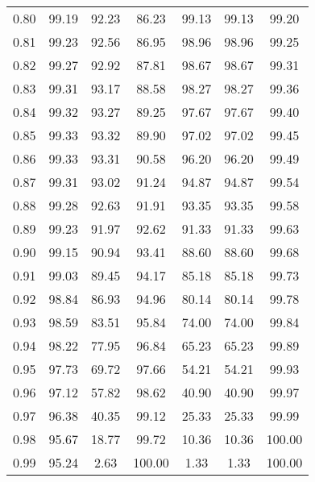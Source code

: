 \begin{tabular}{|c|c|c|c|c|c|c|}
      0.80 &     99.19 &     92.23 &      86.23 &   99.13 &      99.13 &         99.20 \\
      0.81 &     99.23 &     92.56 &      86.95 &   98.96 &      98.96 &         99.25 \\
      0.82 &     99.27 &     92.92 &      87.81 &   98.67 &      98.67 &         99.31 \\
      0.83 &     99.31 &     93.17 &      88.58 &   98.27 &      98.27 &         99.36 \\
      0.84 &     99.32 &     93.27 &      89.25 &   97.67 &      97.67 &         99.40 \\
      0.85 &     99.33 &     93.32 &      89.90 &   97.02 &      97.02 &         99.45 \\
      0.86 &     99.33 &     93.31 &      90.58 &   96.20 &      96.20 &         99.49 \\
      0.87 &     99.31 &     93.02 &      91.24 &   94.87 &      94.87 &         99.54 \\
      0.88 &     99.28 &     92.63 &      91.91 &   93.35 &      93.35 &         99.58 \\
      0.89 &     99.23 &     91.97 &      92.62 &   91.33 &      91.33 &         99.63 \\
      0.90 &     99.15 &     90.94 &      93.41 &   88.60 &      88.60 &         99.68 \\
      0.91 &     99.03 &     89.45 &      94.17 &   85.18 &      85.18 &         99.73 \\
      0.92 &     98.84 &     86.93 &      94.96 &   80.14 &      80.14 &         99.78 \\
      0.93 &     98.59 &     83.51 &      95.84 &   74.00 &      74.00 &         99.84 \\
      0.94 &     98.22 &     77.95 &      96.84 &   65.23 &      65.23 &         99.89 \\
      0.95 &     97.73 &     69.72 &      97.66 &   54.21 &      54.21 &         99.93 \\
      0.96 &     97.12 &     57.82 &      98.62 &   40.90 &      40.90 &         99.97 \\
      0.97 &     96.38 &     40.35 &      99.12 &   25.33 &      25.33 &         99.99 \\
      0.98 &     95.67 &     18.77 &      99.72 &   10.36 &      10.36 &        100.00 \\
      0.99 &     95.24 &      2.63 &     100.00 &    1.33 &       1.33 &        100.00 \\
\bottomrule
\end{tabular}
